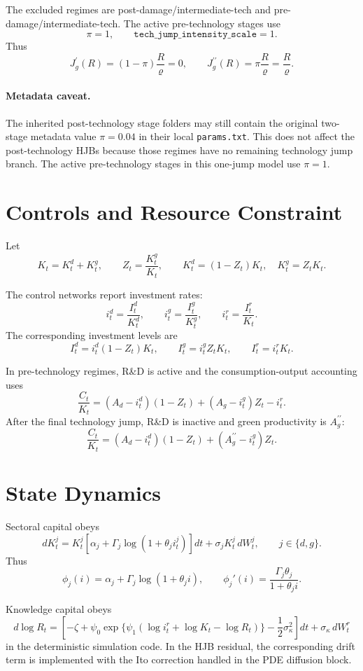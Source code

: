 \documentclass[11pt]{article}
\begin{document}
The excluded regimes are post-damage/intermediate-tech and pre-damage/intermediate-tech.  The active pre-technology stages use
\[
\pi = 1, \qquad \texttt{tech\_jump\_intensity\_scale}=1.
\]
Thus
\[
J_g^{\prime}(R) = (1-\pi)\frac{R}{\varrho}=0,
\qquad
J_g^{\prime\prime}(R) = \pi\frac{R}{\varrho}=\frac{R}{\varrho}.
\]

\paragraph{Metadata caveat.}
The inherited post-technology stage folders may still contain the original two-stage metadata value $\pi=0.04$ in their local \texttt{params.txt}.  This does not affect the post-technology HJBs because those regimes have no remaining technology jump branch.  The active pre-technology stages in this one-jump model use $\pi=1$.

\section{Controls and Resource Constraint}

Let
\[
K_t = K_t^d + K_t^g,
\qquad
Z_t = \frac{K_t^g}{K_t},
\qquad
K_t^d=(1-Z_t)K_t,\quad K_t^g=Z_tK_t.
\]

The control networks report investment rates:
\[
i_t^d = \frac{I_t^d}{K_t^d},
\qquad
i_t^g = \frac{I_t^g}{K_t^g},
\qquad
i_t^r = \frac{I_t^r}{K_t}.
\]
The corresponding investment levels are
\[
I_t^d=i_t^d(1-Z_t)K_t,\qquad
I_t^g=i_t^gZ_tK_t,\qquad
I_t^r=i_t^rK_t.
\]

In pre-technology regimes, R\&D is active and the consumption-output accounting uses
\[
\frac{C_t}{K_t}
=(A_d-i_t^d)(1-Z_t)+(A_g-i_t^g)Z_t-i_t^r.
\]
After the final technology jump, R\&D is inactive and green productivity is $A_g^{\prime\prime}$:
\[
\frac{C_t}{K_t}
=(A_d-i_t^d)(1-Z_t)+(A_g^{\prime\prime}-i_t^g)Z_t.
\]

\section{State Dynamics}

Sectoral capital obeys
\[
dK_t^j
=K_t^j\left[\alpha_j+\Gamma_j\log(1+\theta_j i_t^j)\right]dt
 + \sigma_jK_t^j\,dW_t^j,
\qquad j\in\{d,g\}.
\]
Thus
\[
\phi_j(i)=\alpha_j+\Gamma_j\log(1+\theta_j i),
\qquad
\phi_j'(i)=\frac{\Gamma_j\theta_j}{1+\theta_j i}.
\]

Knowledge capital obeys
\[
d\log R_t
=\left[
-\zeta+\psi_0\exp\{\psi_1(\log i_t^r+\log K_t-\log R_t)\}
-\frac{1}{2}\sigma_\kappa^2
\right]dt+\sigma_\kappa\,dW_t^r
\]
in the deterministic simulation code.  In the HJB residual, the corresponding drift term is implemented with the Ito correction handled in the PDE diffusion block.
\end{document}
